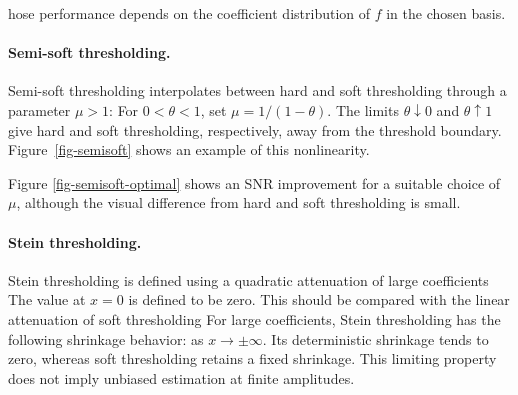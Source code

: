 hose performance depends on the coefficient distribution of $f$ in the chosen basis.

  
\paragraph{Semi-soft thresholding.}

Semi-soft thresholding interpolates between hard and soft thresholding through a parameter $\mu>1$:
For $0<\theta<1$, set $\mu=1/(1-\theta)$. The limits $\theta\downarrow0$ and $\theta\uparrow1$ give hard and soft thresholding, respectively, away from the threshold boundary.
Figure~\ref{fig-semisoft} shows an example of this nonlinearity.


Figure \ref{fig-semisoft-optimal} shows an SNR improvement for a suitable choice of $\mu$, although the visual difference from hard and soft thresholding is small.


  
\paragraph{Stein thresholding.}

Stein thresholding is defined using a quadratic attenuation of large coefficients
The value at $x=0$ is defined to be zero. This should be compared with the linear attenuation of soft thresholding
For large coefficients, Stein thresholding has the following shrinkage behavior:
as $x \rightarrow \pm \infty$. Its deterministic shrinkage tends to zero, whereas soft thresholding retains a fixed shrinkage. This limiting property does not imply unbiased estimation at finite amplitudes.

